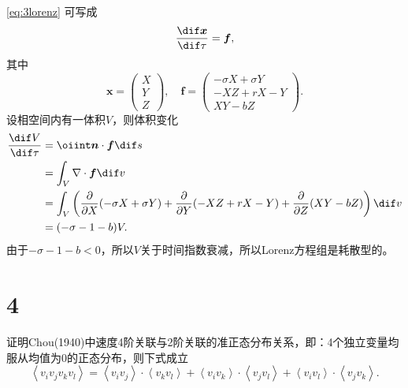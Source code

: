 \documentclass[12pt]{ctexart}
\begin{document}
\cref{eq:3lorenz} 可写成
\begin{equation}
	\frac{\dif \bm{x}}{\dif \tau} = \bm{f},
\end{equation}
其中
\begin{equation}
	\bm{x} = \begin{pmatrix}
		X \\Y\\Z
	\end{pmatrix},\quad
	\bm{f} = \begin{pmatrix}
		-\sigma X+\sigma Y \\-X Z+r X-Y\\X Y-b Z
	\end{pmatrix}.
\end{equation}
设相空间内有一体积$V$，则体积变化
\begin{equation}
	\begin{aligned}
		\frac{\dif V}{\dif \tau} & = \oiint \bm{n} \cdot \bm{f} \dif s                                                                                                                                   \\
		                         & = \int_V \nabla  \cdot \bm{f} \dif v                                                                                                                                  \\
		                         & = \int_V \left(\frac{\partial }{\partial X} (-\sigma X+\sigma Y  ) + \frac{\partial }{\partial Y} (-X Z+r X-Y) + \frac{\partial }{\partial Z} (X Y-b Z )\right)\dif v \\
		                         & = (-\sigma - 1 - b) V.
	\end{aligned}
\end{equation}
由于$-\sigma - 1 - b<0$，所以$V$关于时间指数衰减，所以Lorenz方程组是耗散型的。


\section{4}

证明Chou(1940)中速度4阶关联与2阶关联的准正态分布关系，即：4个独立变量均服从均值为0的正态分布，则下式成立
\begin{equation}
	\left\langle v_{i} v_{j} v_{k} v_{l}\right\rangle=\left\langle v_{i} v_{j}\right\rangle \cdot\left\langle v_{k} v_{l}\right\rangle+\left\langle v_{i} v_{k}\right\rangle \cdot\left\langle v_{j} v_{l}\right\rangle+\left\langle v_{i} v_{l}\right\rangle \cdot\left\langle v_{j} v_{k}\right\rangle.
\end{equation}
\end{document}
